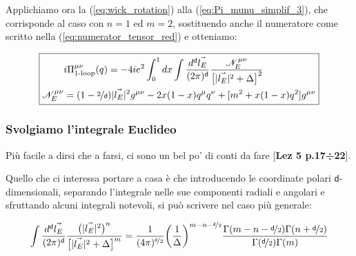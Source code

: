 \documentclass[../main.tex]{subfiles}
\begin{document}
Applichiamo ora la (\ref{eq:wick_rotation}) alla (\ref{eq:Pi_munu_simplif_3}), che corrisponde al caso con $n=1$ ed $m=2$, sostituendo anche il numeratore come scritto nella (\ref{eq:numerator_tensor_red}) e otteniamo:

\begin{equation}
    \boxed{
    \begin{aligned}
        &i\Pi^{\mu\nu}_{\text{1-loop}}(q)  = - 4ie^2\int_0^1dx \int \frac{d^\mathsf{d} \Vec{l_E}}{(2\pi)^\mathsf{d}} \frac{ \mathscr{N}^{\mu\nu}_E }{\bigl[|\Vec{l_E}|^2 + \Delta\bigr]^2} \\
        \mathscr{N}^{\mu\nu}_E & = (1 - \nicefrac{2}{\mathsf d}) |\Vec{l_E}|^2g^{\mu\nu} - 2x(1-x)q^\mu q^\nu + [m^2 + x(1-x)q^2]g^{\mu\nu}
    \end{aligned}}
    \label{eq:Pi_munu_rotated}
\end{equation}

\subsubsection{Svolgiamo l'integrale Euclideo}
Più facile a dirsi che a farsi, ci sono un bel po' di conti da fare [\textbf{Lez 5 p.17÷22}].

Quello che ci interessa portare a casa è che introducendo le coordinate polari $\mathsf d$-dimensionali, separando l'integrale nelle sue componenti radiali e angolari e sfruttando alcuni integrali notevoli, si può scrivere nel caso più generale:

\begin{equation}
    \int \frac{d^\mathsf{d} \Vec{l_E}}{(2\pi)^\mathsf{d}} \frac{\bigl(|\Vec{l_E}|^2\bigr)^n}{\bigl[|\Vec{l_E}|^2 + \Delta\bigr]^m} = \frac{1}{(4\pi)^{\nicefrac{\mathsf d}{2}}} \bigg(\frac{1}{\Delta}\bigg)^{m-n-\nicefrac{\mathsf d}{2}}\frac{\Gamma(m-n-\nicefrac{\mathsf d}{2})\Gamma(n+\nicefrac{\mathsf d}{2})}{\Gamma(\nicefrac{\mathsf d}{2})\Gamma(m)}
    \label{eq:euclidean_integral_general}
\end{equation}
\end{document}
